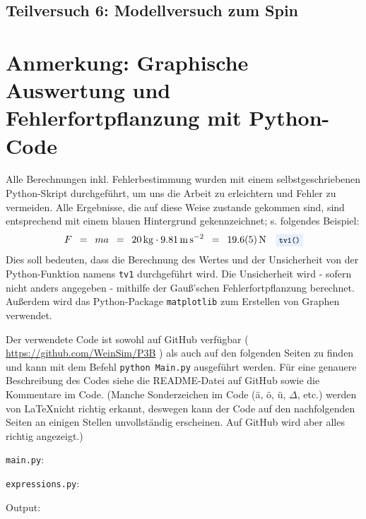 \documentclass{article}
\newcommand{\widespace}{\enspace}
\newcommand{\wideeq}{\widespace = \widespace}
\newcommand{\coderef}[1]{%
    \text{\footnotesize \colorbox{codebg}{\texttt{#1()}}}%
}
\newcommand{\githuburl}{
    \url{https://github.com/WeinSim/P3B}
}
\begin{document}
\newpage

\subsection{Teilversuch 6: Modellversuch zum Spin}

\newpage


\section{Anmerkung: Graphische Auswertung und Fehlerfortpflanzung mit Python-Code}

Alle Berechnungen inkl. Fehlerbestimmung wurden mit einem selbstgeschriebenen
Python-Skript durchgeführt, um uns die Arbeit zu erleichtern und Fehler zu
vermeiden. Alle Ergebnisse, die auf diese Weise zustande gekommen sind,
sind entsprechend mit einem \colorbox{codebg}{blauen Hintergrund} gekennzeichnet;
s. folgendes Beispiel:
\[
    F \wideeq ma \wideeq \qty{20}{\kg} \cdot \qty{9.81}{\meter\per\square\second}
    \wideeq \qty{19.6 \pm 0.5}{\newton} \quad \coderef{tv1}
\]
Dies soll bedeuten, dass die Berechnung des Wertes und der Unsicherheit von der
Python-Funktion namens \verb|tv1| durchgeführt wird.
Die Unsicherheit wird - sofern nicht anders angegeben - mithilfe der Gauß'schen
Fehlerfortpflanzung berechnet.
Außerdem wird das Python-Package \texttt{matplotlib} zum Erstellen
von Graphen verwendet.

Der verwendete Code ist sowohl auf GitHub verfügbar (\githuburl) als auch auf den
folgenden Seiten zu finden und kann mit dem Befehl \texttt{python Main.py}
ausgeführt werden. Für eine genauere Beschreibung des Codes siehe die README-Datei
auf GitHub sowie die Kommentare im Code.
(Manche Sonderzeichen im Code (ä, ö, ü, $\Delta$, etc.) werden von \LaTeX nicht
richtig erkannt, deswegen kann der Code auf den nachfolgenden Seiten an einigen
Stellen unvollständig erscheinen. Auf GitHub wird aber alles richtig angezeigt.)

\newpage


\verb|main.py|:

\newpage

\verb|expressions.py|:

\newpage

Output:


\fi
\end{document}
